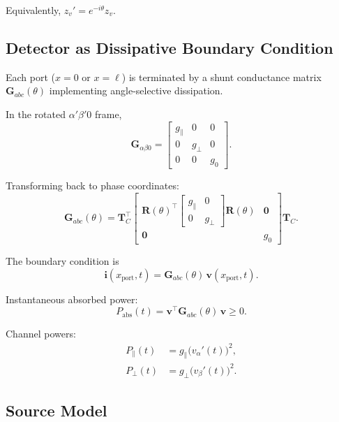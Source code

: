 Equivalently, $z_v' = e^{-i\theta} z_v$.

\subsection{Detector as Dissipative Boundary Condition}

Each port ($x=0$ or $x=\ell$) is terminated by a shunt conductance matrix $\mathbf G_{abc}(\theta)$ implementing angle-selective dissipation.

In the rotated $\alpha'\beta'0$ frame,
\begin{equation}
\mathbf G_{\alpha\beta0} =
\begin{bmatrix}
g_\parallel & 0 & 0 \\
0 & g_\perp & 0 \\
0 & 0 & g_0
\end{bmatrix}.
\end{equation}

Transforming back to phase coordinates:
\begin{equation}
\mathbf G_{abc}(\theta)
=
\mathbf T_C^\top
\begin{bmatrix}
\mathbf R(\theta)^\top
\begin{bmatrix}
g_\parallel & 0 \\
0 & g_\perp
\end{bmatrix}
\mathbf R(\theta) & \mathbf 0 \\
\mathbf 0 & g_0
\end{bmatrix}
\mathbf T_C.
\end{equation}

The boundary condition is
\begin{equation}
\mathbf i(x_{\text{port}},t) = \mathbf G_{abc}(\theta)\, \mathbf v(x_{\text{port}},t).
\end{equation}

Instantaneous absorbed power:
\begin{equation}
P_{\text{abs}}(t)
=
\mathbf v^\top \mathbf G_{abc}(\theta)\, \mathbf v
\ge 0.
\end{equation}

Channel powers:
\begin{align}
P_\parallel(t) &= g_\parallel \big(v_\alpha'(t)\big)^2, \\
P_\perp(t) &= g_\perp \big(v_\beta'(t)\big)^2.
\end{align}

\subsection{Source Model}

